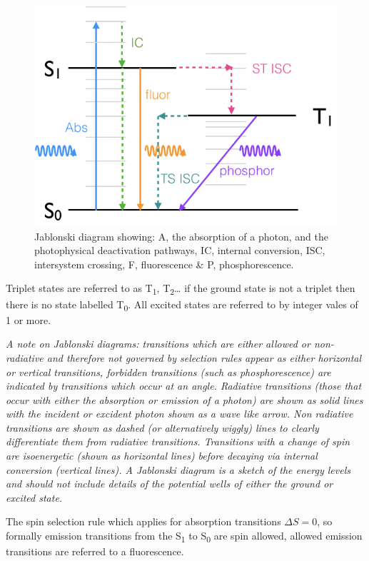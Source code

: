 \documentclass[
]{book}
\begin{document}
\begin{figure}

{\centering \includegraphics[width=0.7\linewidth]{images/Jablonski} 

}

\caption{Jablonski diagram showing: A, the absorption of a photon, and the photophysical deactivation pathways, IC, internal conversion, ISC, intersystem crossing, F, fluorescence \& P, phosphorescence.}\label{fig:Jablonski}
\end{figure}

Triplet states are referred to as T\textsubscript{1}, T\textsubscript{2}\ldots{} if the ground state is not a triplet then there is no state labelled T\textsubscript{0}. All excited states are referred to by integer vales of 1 or more.

\emph{A note on Jablonski diagrams: transitions which are either allowed or non-radiative and therefore not governed by selection rules appear as either horizontal or vertical transitions, forbidden transitions (such as phosphorescence) are indicated by transitions which occur at an angle. Radiative transitions (those that occur with either the absorption or emission of a photon) are shown as solid lines with the incident or excident photon shown as a wave like arrow. Non radiative transitions are shown as dashed (or alternatively wiggly) lines to clearly differentiate them from radiative transitions. Transitions with a change of spin are isoenergetic (shown as horizontal lines) before decaying via internal conversion (vertical lines). A Jablonski diagram is a sketch of the energy levels and should not include details of the potential wells of either the ground or excited state.}

The spin selection rule which applies for absorption transitions \(\Delta S = 0\), so formally emission transitions from the S\textsubscript{1} to S\textsubscript{0} are spin allowed, allowed emission transitions are referred to a fluorescence.
\end{document}

